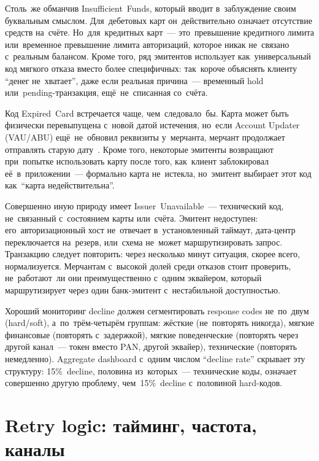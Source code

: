 Столь~же обманчив  Insufficient~Funds, который вводит в~заблуждение своим буквальным
смыслом. Для~дебетовых карт он~действительно означает отсутствие средств
на~счёте. Но~для~кредитных карт~--- это~превышение кредитного лимита
или~временное превышение лимита авторизаций, которое никак не~связано
с~реальным балансом. Кроме того, ряд эмитентов использует 
как~универсальный код мягкого отказа вместо более специфичных: так~короче
объяснять клиенту \enquote{денег не~хватает}, даже если реальная причина~---
временный hold или~pending-транзакция, ещё~не~списанная со~счёта.

Код  Expired~Card встречается чаще, чем~следовало~бы. Карта
может быть физически перевыпущена с~новой датой истечения, но~если
Account Updater (VAU/ABU) ещё~не~обновил реквизиты у~мерчанта, мерчант
продолжает отправлять старую дату~. Кроме того,
некоторые эмитенты возвращают  при~попытке использовать карту
после того, как~клиент заблокировал её~в~приложении~--- формально карта
не~истекла, но~эмитент выбирает этот код как~\enquote{карта недействительна}.

Совершенно иную природу имеет  Issuer~Unavailable~--- технический код, не~связанный
с~состоянием карты или~счёта. Эмитент недоступен: его~авторизационный
хост не~отвечает в~установленный таймаут, дата-центр переключается на~резерв,
или~схема не~может маршрутизировать запрос. Транзакцию следует повторить:
через несколько минут ситуация, скорее всего, нормализуется. Мерчантам
с~высокой долей  среди отказов стоит проверить, не~работают~ли
они преимущественно с~одним эквайером, который маршрутизирует через
один банк-эмитент с~нестабильной доступностью.

\begin{practice}
  Хороший мониторинг decline должен сегментировать response codes не~по~двум
  (hard/soft), а~по~трём-четырём группам: жёсткие (не~повторять никогда),
  мягкие финансовые (повторять с~задержкой), мягкие поведенческие
  (повторять через другой канал~--- токен вместо PAN, другой эквайер),
  технические (повторять немедленно). Aggregate dashboard с~одним числом
  \enquote{decline rate} скрывает эту структуру: 15\%~decline, половина из~которых~---
  технические коды, означает совершенно другую проблему, чем~15\%~decline
  с~половиной hard-кодов.
\end{practice}


\section{Retry logic: тайминг, частота, каналы}
\label{sec:decline-retry}

